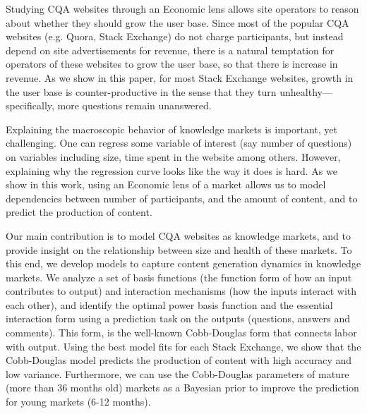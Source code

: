 

Studying CQA websites through an Economic lens allows site operators to reason about whether they should grow the user base. Since most of the popular CQA websites (e.g. Quora, Stack Exchange) do not charge participants, but instead depend on site advertisements for revenue, there is a natural temptation for operators of these websites to grow the user base, so that there is increase in revenue. As we show in this paper, for most Stack Exchange websites, growth in the user base is counter-productive in the sense that they turn unhealthy---specifically, more questions remain unanswered.

Explaining the macroscopic behavior of knowledge markets is important, yet challenging. One can regress some variable of interest (say number of questions) on variables including size, time spent in the website among others. However, explaining why the regression curve looks like the way it does is hard. As we show in this work, using an Economic lens of a market allows us to model dependencies between number of participants, and the amount of content, and to predict the production of content.


Our main contribution is to model CQA websites as knowledge markets, and to provide insight on the relationship between size and health of these markets. To this end, we develop models to capture content generation dynamics in knowledge markets. We analyze a set of basis functions (the function form of how an input contributes to output) and interaction mechanisms (how the inputs interact with each other), and identify the optimal power basis function and the essential interaction form using a prediction task on the outputs (questions, answers and comments). This form, is the well-known Cobb-Douglas form that connects labor with output. Using the best model fits for each Stack Exchange, we show that the Cobb-Douglas model predicts the production of content with high accuracy and low variance. Furthermore, we can use the Cobb-Douglas parameters of mature (more than 36 months old) markets as a Bayesian prior to improve the prediction for young markets (6-12 months).


